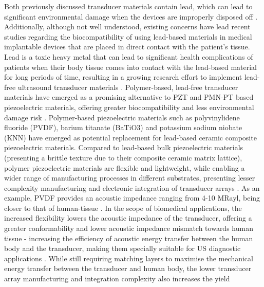 Both previously discussed transducer materials contain lead, which can lead to significant 
environmental damage when the devices are improperly disposed off \cite{https://iopscience.iop.org/article/10.1088/1361-6463/ac8687, 
https://doi.org/10.1533/9781845699758.1.318, https://doi.org/10.1016/j.ceramint.2021.03.054}. 
Additionally, although not well understood, existing concerns have lead recent studies regarding the biocompatibility of using lead-based materials 
in medical implantable devices that are placed in direct contact with the patient's tissue. Lead is a toxic heavy metal that can lead to significant health complications of patients when their body tissue comes into contact with the lead-based material for long periods of time, 
resulting in a growing research effort to implement lead-free ultrasound transducer materials \cite{https://doi.org/10.1016/j.ceramint.2021.03.054, https://iopscience.iop.org/article/10.1088/1361-6463/ac8687}. Polymer-based, lead-free transducer materials have emerged as a promising alternative to PZT and PMN-PT 
based piezoelectric materials, offering greater biocompatibility and less environmental damage risk 
\cite{https://iopscience.iop.org/article/10.1088/1361-6463/ac8687}. 
Polymer-based piezoelectric materials such as polyvinylidene fluoride (PVDF), 
barium titanate (BaTiO3) and potassium sodium niobate (KNN) have emerged as potential replacement 
for lead-based ceramic composite piezoelectric materials.
Compared to lead-based bulk piezoelectric materials 
(presenting a brittle texture due to their composite ceramic matrix lattice), 
polymer piezoelectric materials are flexible and lightweight, while enabling a 
wider range of manufacturing processes in different substrates, presenting lesser 
complexity manufacturing and electronic integration of transducer arrays 
\cite{https://doi.org/10.1016/j.ceramint.2021.03.054}. As an example, PVDF provides an acoustic impedance 
ranging from 4-10 MRayl, being closer to that of human-tissue \cite{https://ieeexplore.ieee.org/abstract/document/9354791}. 
In the scope of biomedical applications, 
the increased flexibility lowers the acoustic impedance of the transducer, offering a greater 
conformability and lower acoustic impedance mismatch towards human tissue - increasing the efficiency 
of acoustic energy transfer between the human body and the transducer, making them specially suitable for 
US diagnostic applications \cite{https://doi.org/10.1016/j.ceramint.2021.03.054}. 
While still requiring matching layers to maximise the mechanical energy transfer between the 
transducer and human body, the lower transducer array manufacturing and integration complexity also increases the yield 

